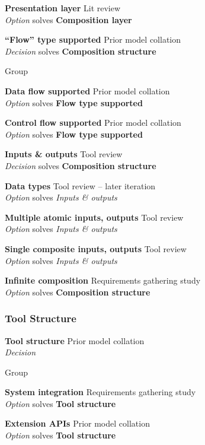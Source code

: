 \textbf{Presentation layer} \hfill Lit review \cite{Paterno2011} \\ \emph{Option} \hfill solves \textbf{Composition layer}

\textbf{``Flow'' type supported} \hfill Prior model collation \\ \emph{Decision} \hfill solves \textbf{Composition structure}

Group

\textbf{Data flow supported} \hfill Prior model collation \cite{Grammel2010,Pietschmann2010} \\ \emph{Option} \hfill solves \textbf{Flow type supported}

\textbf{Control flow supported} \hfill Prior model collation \cite{Grammel2010,Pietschmann2010} \\ \emph{Option} \hfill solves \textbf{Flow type supported}

\textbf{Inputs \& outputs} \hfill Tool review \\ \emph{Decision} \hfill solves \textbf{Composition structure}

\textbf{Data types} \hfill Tool review  -- later iteration \\ \emph{Option} \hfill solves \emph{Inputs \& outputs}

\textbf{Multiple atomic inputs, outputs} \hfill Tool review \\ \emph{Option} \hfill solves \emph{Inputs \& outputs}

\textbf{Single composite inputs, outputs} \hfill Tool review \\ \emph{Option} \hfill solves \emph{Inputs \& outputs}

\textbf{Infinite composition} \hfill Requirements gathering study \\ \emph{Option} \hfill solves \textbf{Composition structure}

\subsubsection{Tool Structure}

\textbf{Tool structure} \hfill Prior model collation \\ \emph{Decision} \hfill 

Group

\textbf{System integration} \hfill Requirements gathering study \\ \emph{Option} \hfill solves \textbf{Tool structure}

\textbf{Extension APIs} \hfill Prior model collation \cite{Grammel2010} \\ \emph{Option} \hfill solves \textbf{Tool structure}

